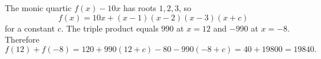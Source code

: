 The monic quartic $f(x)-10x$ has roots $1,2,3$, so
\[
f(x)=10x+(x-1)(x-2)(x-3)(x+c)
\]
for a constant $c$. The triple product equals $990$ at $x=12$ and $-990$ at $x=-8$. Therefore
\[
f(12)+f(-8)=120+990(12+c)-80-990(-8+c)
=40+19800=\boxed{19840}.
\]
